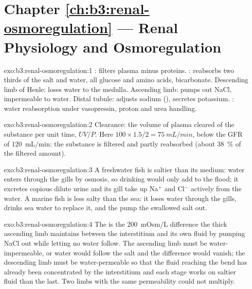 \section*{Chapter \ref{ch:b3:renal-osmoregulation} --- Renal Physiology and Osmoregulation}

\begin{solution}{exo:b3:renal-osmoregulation:1}
: filters plasma minus proteins. : reabsorbs
two thirds of the salt and water, all glucose and amino acids,
bicarbonate. Descending limb of Henle: loses water to the medulla.
Ascending limb: pumps out NaCl, impermeable to water. Distal tubule:
adjusts sodium (), secretes potassium. :
water reabsorption under vasopressin, proton and urea handling.
\end{solution}

\begin{solution}{exo:b3:renal-osmoregulation:2}
Clearance: the volume of plasma cleared of the substance per unit
time, $UV/P$. Here $100\times 1.5/2 = \qty{75}{mL/min}$, below the GFR
of \qty{120}{mL/min}: the substance is filtered and partly reabsorbed
(about \qty{38}{\%} of the filtered amount).
\end{solution}

\begin{solution}{exo:b3:renal-osmoregulation:3}
A freshwater fish is saltier than its medium: water enters through
the gills by osmosis, so drinking would only add to the flood; it
excretes copious dilute urine and its gill  take up
Na$^{+}$ and Cl$^{-}$ actively from the water. A marine fish is less
salty than the sea: it loses water through the gills, drinks sea water
to replace it, and the  pump the swallowed salt out.
\end{solution}

\begin{solution}{exo:b3:renal-osmoregulation:4}
The  is the \qty{200}{mOsm/L} difference the thick
ascending limb maintains between the interstitium and its own fluid
by pumping NaCl out while letting no water follow. The ascending limb
must be water-impermeable, or water would follow the salt and the
difference would vanish; the descending limb must be water-permeable so
that the fluid reaching the bend has already been concentrated by the
interstitium and each stage works on saltier fluid than the last. Two
limbs with the same permeability could not multiply.
\end{solution}

